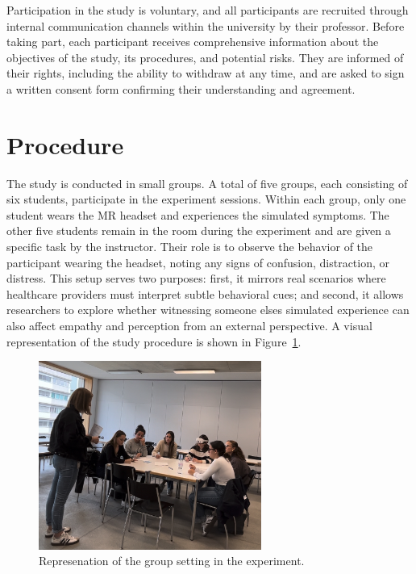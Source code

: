 \vspace{1em}

Participation in the study is voluntary, and all participants are recruited through internal communication channels within the university by their professor. Before taking part, each participant receives comprehensive information about the objectives of the study, its procedures, and potential risks. They are informed of their rights, including the ability to withdraw at any time, and are asked to sign a written consent form confirming their understanding and agreement.


\section{Procedure}

The study is conducted in small groups. A total of five groups, each consisting of six students, participate in the experiment sessions. Within each group, only one student wears the MR headset and experiences the simulated symptoms. The other five students remain in the room during the experiment and are given a specific task by the instructor. Their role is to observe the behavior of the participant wearing the headset, noting any signs of confusion, distraction, or distress. This setup serves two purposes: first, it mirrors real scenarios where healthcare providers must interpret subtle behavioral cues; and second, it allows researchers to explore whether witnessing someone elses simulated experience can also affect empathy and perception from an external perspective. A visual representation of the study procedure is shown in Figure~\ref{fig:group-setting}.

\begin{figure}[htbp]
    \centering
    \includegraphics[width=0.65\textwidth]{../../Figures/Group-setting-02.jpg}
    \caption{Represenation of the group setting in the experiment.}
    \label{fig:group-setting}
\end{figure}

